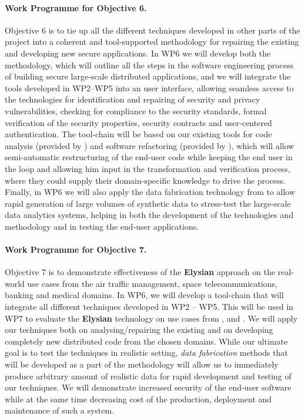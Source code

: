 \documentclass[a4paper,11pt]{article}
\newcommand{\project}[1]{\textbf{#1}\xspace}
\newcommand{\SECURITY}{\project{Elysian}}
\newcommand{\TheProject}{\SECURITY}
\begin{document}
\paragraph{Work Programme for Objective 6.} 

Objective 6 is to tie up all the different techniques developed in other parts of the project into a coherent and tool-supported methodology for repairing the existing and developing new secure applications. In WP6 we will develop both the methodology, which will outline all the steps in the software engineering process of building secure large-scale distributed applications, and we will integrate the tools developed in WP2--WP5 into an user interface, allowing seamless access to the technologies for identification and repairing of security and privacy vulnerabilities, checking for compliance to the security standards, formal verification of the security properties, security contracts and user-centered authentication. The tool-chain will be based on our existing tools for code analysis (provided by \YAGshort{}) and software refactoring (provided by \SAshort{}), which will allow semi-automatic restructuring of the end-user code while keeping the end user in the loop and allowing him input in the transformation and verification process, where they could supply their domain-specific knowledge to drive the process. Finally, in WP6 we will also apply the data fabrication technology from \IBMshort{} to allow rapid generation of large volumes of synthetic data to stress-test the large-scale data analytics systems, helping in both the development of the technologies and methodology and in testing the end-user applications.

\paragraph{Work Programme for Objective 7.} 

Objective 7 is to demonstrate effectiveness of the \TheProject{} approach on the real-world use cases from the air traffic management, space telecommunications, banking and medical domains. In WP6, we will develop a tool-chain that will integrate all different techniques developed in WP2 -- WP5. This will be used in WP7 to evaluate the \TheProject{} technology  on use cases from \SOPRAshort{}, \FRQshort{} and \DEMshort{}. We will apply our techniques both on analysing/repairing the existing and on developing completely new distributed code from the chosen domains. While our ultimate goal is to test the techniques in realistic setting, \emph{data fabrication} methods that will be developed as a part of the methodology will allow us to immediately produce arbitrary amount of realistic data for rapid development and testing of our techniques. We will demonstrate increased security of the end-user software while at the same time decreasing cost of the production, deployment and maintenance of such a system.
\end{document}
